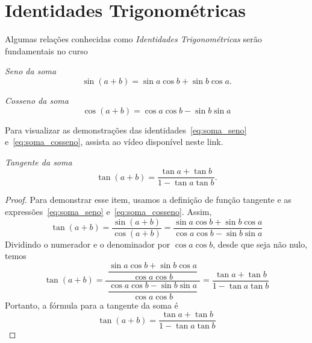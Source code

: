 \section{Identidades Trigonométricas}

Algumas relações conhecidas como \emph{Identidades Trigonométricas} serão
fundamentais no curso

\emph{Seno da soma}
\begin{equation}
  \label{eq:soma_seno}
  \sin(a + b) = \sin a \cos b + \sin b \cos a.
\end{equation}

\emph{Cosseno da soma}
\begin{equation}
  \label{eq:soma_cosseno}
  \cos(a + b) = \cos a\cos b - \sin b \sin a
\end{equation}

{
  Para visualizar as demonstrações das identidades~\eqref{eq:soma_seno}
  e~\eqref{eq:soma_cosseno}, assista ao vídeo disponível neste link.
}

\emph{Tangente da soma}
\begin{equation}
  \label{eq:soma_tangente}
  \tan(a + b) = \frac{\tan a + \tan b}{1 - \tan a \tan b}.
\end{equation}

\begin{proof}
  Para demonstrar esse item, usamos a definição de função tangente e
  as expressões~\eqref{eq:soma_seno} e~\eqref{eq:soma_cosseno}. Assim,
  \[
    \tan(a+b)
    = \frac{\sin(a+b)}{\cos(a+b)}
    = \frac{\sin a\cos b+\sin b\cos a}{\cos a\cos b-\sin b\sin a}
  \]
  Dividindo o numerador e o denominador por $\cos a\cos b$, desde que
  seja não nulo, temos
  \[
    \tan(a+b)
    = \frac{\;\dfrac{\sin a\cos b+\sin b\cos a}{\cos a\cos b}\;}
           {\;\dfrac{\cos a\cos b-\sin b\sin a}{\cos a\cos b}\;}
    = \frac{\tan a+\tan b}{1-\tan a\tan b}
  \]
  Portanto, a fórmula para a tangente da soma é
  \[
    \tan(a+b)=\frac{\tan a+\tan b}{1-\tan a\tan b}
  \]
\end{proof}

